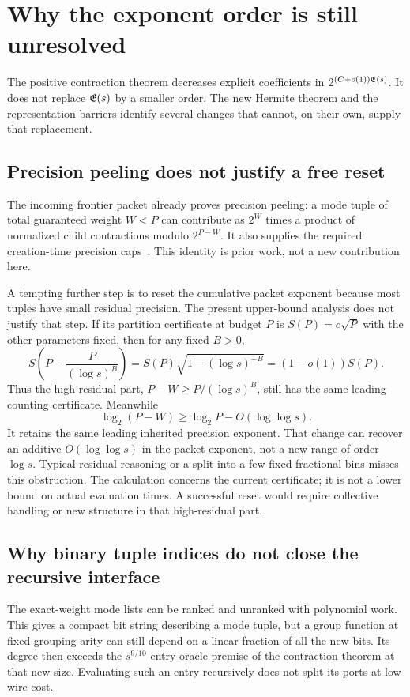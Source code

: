 \section{Why the exponent order is still unresolved}
\label{sec:research}

The positive contraction theorem decreases explicit coefficients in
$2^{(C+o(1))\mathfrak E(s)}$. It does not replace $\mathfrak E(s)$ by a smaller
order. The new Hermite theorem and the representation barriers identify
several changes that cannot, on their own, supply that replacement.

\subsection{Precision peeling does not justify a free reset}

The incoming frontier packet already proves precision peeling:
a mode tuple of total guaranteed weight $W<P$ can contribute as
$2^W$ times a product of normalized child contractions modulo $2^{P-W}$.
It also supplies the required creation-time precision caps~\cite{frontier}.
This identity is prior work, not a new contribution here.

A tempting further step is to reset the cumulative packet exponent
because most tuples have small residual precision. The present
upper-bound analysis does not justify that step. If its partition
certificate at budget $P$ is $S(P)=c\sqrt P$ with the other parameters
fixed, then for any fixed $B>0$,
\[
 S\!\left(P-\frac{P}{(\log s)^B}\right)
 =S(P)\sqrt{1-(\log s)^{-B}}
 =(1-o(1))S(P).
\]
Thus the high-residual part, $P-W\ge P/(\log s)^B$, still has the
same leading counting certificate. Meanwhile
\[
 \log_2(P-W)\ge\log_2P-O(\log\log s).
\]
It retains the same leading inherited precision exponent.
That change can recover an additive $O(\log\log s)$ in the packet
exponent, not a new range of order $\log s$.
Typical-residual reasoning or a split into a few fixed fractional
bins misses this obstruction. The calculation concerns the current
certificate; it is not a lower bound on actual evaluation times.
A successful reset would require collective handling or new structure
in that high-residual part.

\subsection{Why binary tuple indices do not close the recursive interface}

The exact-weight mode lists can be ranked and unranked with polynomial
work. This gives a compact bit string describing a mode tuple, but a
group function at fixed grouping arity can still depend on a linear
fraction of all the new bits. Its degree then exceeds the
$s^{9/10}$ entry-oracle premise of the contraction theorem at that
new size. Evaluating such an entry recursively does not split its
ports at low wire cost.

